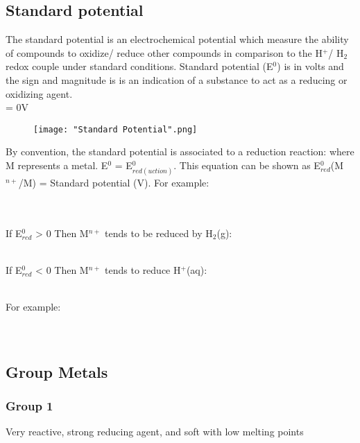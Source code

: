 \documentclass[a4paper, 12pt]{article}
\begin{document}
		\subsection*{Standard potential}
			The standard potential is an electrochemical potential which measure the ability of compounds to oxidize/ reduce other compounds in comparison to the H$^+$/ H$_2$ redox couple under standard conditions. Standard potential (E$^0$) is in volts and the sign and magnitude is is an indication of a substance to act as a reducing or oxidizing agent. \\
			 = 0V \\
			
			\begin{figure}[!h]
				\texttt{[image: "Standard Potential".png]}
			\end{figure}
			\pagebreak
			By convention, the standard potential is associated to a reduction reaction:  where M represents a metal. E$^0$ = E$^0_{red(uction)}$. This equation can be shown as E$^0_{red}$(M$^{n+}$/M) = Standard potential (V). For example: \\
			 \\
			 \\
			\par
			If E$^0_{red}$ > 0 Then M$^{n+}$ tends to be reduced by H$_2$(g): \\
			 \\
			\par
			If E$^0_{red}$ < 0 Then M$^{n+}$ tends to reduce H$^+$(aq): \\
			 \\
			\par
			For example: \\
			 \\
			 \\
			
		\subsection*{Group Metals}
			\subsubsection*{Group 1}
				Very reactive, strong reducing agent, and soft with low melting points
\end{document}

